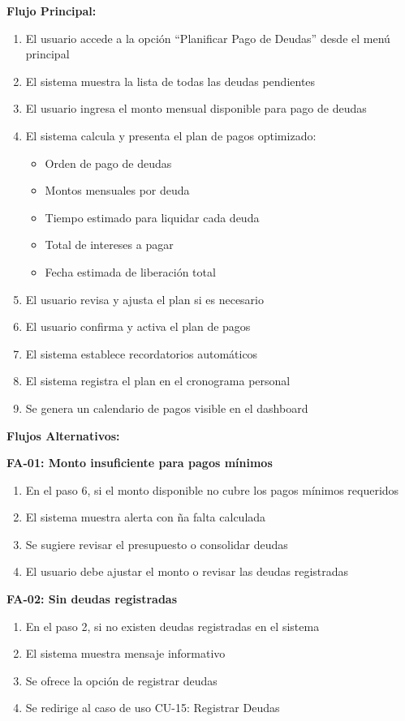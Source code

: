 \noindent\textbf{Flujo Principal:}
\begin{enumerate}
    \item El usuario accede a la opción ``Planificar Pago de Deudas'' desde el menú principal
    \item El sistema muestra la lista de todas las deudas pendientes
    \item El usuario ingresa el monto mensual disponible para pago de deudas
    \item El sistema calcula y presenta el plan de pagos optimizado:
    \begin{itemize}
        \item Orden de pago de deudas
        \item Montos mensuales por deuda
        \item Tiempo estimado para liquidar cada deuda
        \item Total de intereses a pagar
        \item Fecha estimada de liberación total
    \end{itemize}
    \item El usuario revisa y ajusta el plan si es necesario
    \item El usuario confirma y activa el plan de pagos
    \item El sistema establece recordatorios automáticos
    \item El sistema registra el plan en el cronograma personal
    \item Se genera un calendario de pagos visible en el dashboard
\end{enumerate}

\noindent\textbf{Flujos Alternativos:}

\textbf{FA-01: Monto insuficiente para pagos mínimos}
\begin{enumerate}
    \item En el paso 6, si el monto disponible no cubre los pagos mínimos requeridos
    \item El sistema muestra alerta con ña falta calculada
    \item Se sugiere revisar el presupuesto o consolidar deudas
    \item El usuario debe ajustar el monto o revisar las deudas registradas
\end{enumerate}

\textbf{FA-02: Sin deudas registradas}
\begin{enumerate}
    \item En el paso 2, si no existen deudas registradas en el sistema
    \item El sistema muestra mensaje informativo
    \item Se ofrece la opción de registrar deudas
    \item Se redirige al caso de uso CU-15: Registrar Deudas
\end{enumerate}

